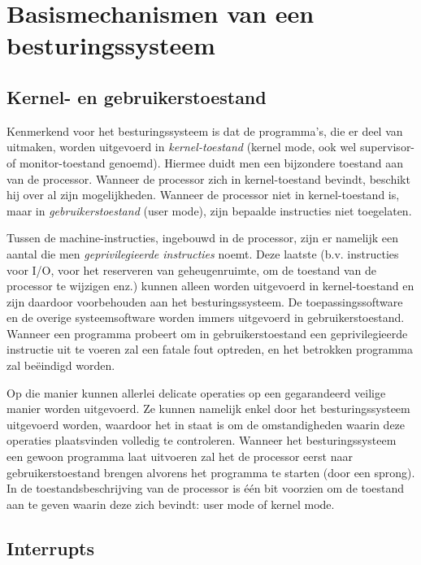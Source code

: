 \chapter{Basismechanismen van een besturingssysteem}

\section{Kernel- en gebruikerstoestand}

Kenmerkend voor het besturingssysteem is dat de programma's, die
er deel van uitmaken, worden uitgevoerd in
\emph{kernel-toestand} (kernel mode, ook wel supervisor-
of monitor-toestand genoemd). Hiermee duidt men een bijzondere toestand
aan van de processor. Wanneer de processor zich in kernel-toestand
bevindt, beschikt hij over al zijn mogelijkheden. Wanneer de processor
niet in kernel-toestand is, maar in
\emph{gebruikerstoestand} (user mode), zijn bepaalde
instructies niet toegelaten.

Tussen de machine-instructies, ingebouwd in de processor, zijn er
namelijk een aantal die men \emph{geprivilegieerde instructies}
noemt. Deze laatste (b.v. instructies voor I/O, voor het
reserveren van geheugenruimte, om de toestand van de processor te
wijzigen enz.) kunnen alleen worden uitgevoerd in kernel-toestand en
zijn daardoor voorbehouden aan het besturingssysteem. De
toepassingssoftware en de overige systeemsoftware worden immers
uitgevoerd in gebruikerstoestand. Wanneer een programma probeert om in
gebruikerstoestand een geprivilegieerde instructie uit te voeren zal een
fatale fout optreden, en het betrokken programma zal be\"eindigd
worden.

Op die manier kunnen allerlei delicate operaties op een
gegarandeerd veilige manier worden uitgevoerd. Ze kunnen namelijk enkel
door het besturingssysteem uitgevoerd worden, waardoor het in staat is
om de omstandigheden waarin deze operaties plaatsvinden volledig te
controleren. Wanneer het besturingssysteem een gewoon programma laat
uitvoeren zal het de processor eerst naar gebruikerstoestand brengen
alvorens het programma te starten (door een sprong). In de
toestandsbeschrijving van de processor is \'e\'en bit voorzien om de
toestand aan te geven waarin deze zich bevindt: user mode of kernel
mode.

\section{Interrupts}

